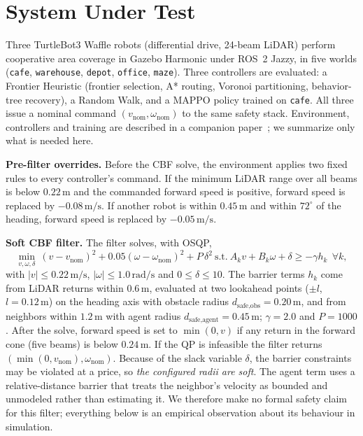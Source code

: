 \documentclass[12pt]{article}
\newcommand{\si}[1]{\mathrm{#1}}
\begin{document}
\section{System Under Test}
\label{sec:system}
Three TurtleBot3 Waffle robots (differential drive, 24-beam LiDAR) perform
cooperative area coverage in Gazebo Harmonic under ROS~2 Jazzy, in five
worlds (\texttt{cafe}, \texttt{warehouse}, \texttt{depot}, \texttt{office},
\texttt{maze}). Three controllers are evaluated: a Frontier Heuristic
(frontier selection, A* routing, Voronoi partitioning, behavior-tree
recovery), a Random Walk, and a MAPPO policy trained on \texttt{cafe}. All
three issue a nominal command $(v_{\text{nom}},\omega_{\text{nom}})$ to the
same safety stack. Environment, controllers and training are described in a
companion paper~\cite{pandhe2026mappo}; we summarize only what is needed
here.

\textbf{Pre-filter overrides.} Before the CBF solve, the environment applies
two fixed rules to every controller's command. If the minimum LiDAR range
over all beams is below $0.22\,\si{m}$ and the commanded forward speed is
positive, forward speed is replaced by $-0.08\,\si{m/s}$. If another robot
is within $0.45\,\si{m}$ and within $72^\circ$ of the heading, forward speed
is replaced by $-0.05\,\si{m/s}$.

\textbf{Soft CBF filter.} The filter solves, with OSQP,
\begin{equation}
\min_{v,\omega,\delta}\ (v-v_{\text{nom}})^2 + 0.05(\omega-\omega_{\text{nom}})^2
+ P\,\delta^2
\ \text{s.t.}\ A_k v + B_k\omega + \delta \ge -\gamma h_k\ \ \forall k,
\end{equation}
with $|v|\le0.22\,\si{m/s}$, $|\omega|\le1.0\,\si{rad/s}$ and
$0\le\delta\le10$. The barrier terms $h_k$ come from LiDAR returns within
$0.6\,\si{m}$, evaluated at two lookahead points ($\pm l$, $l=0.12\,\si{m}$)
on the heading axis with obstacle radius $d_{\text{safe,obs}}=0.20\,\si{m}$,
and from neighbors within $1.2\,\si{m}$ with agent radius
$d_{\text{safe,agent}}=0.45\,\si{m}$; $\gamma=2.0$ and $P=1000$. After the
solve, forward speed is set to $\min(0,v)$ if any return in the forward cone
(five beams) is below $0.24\,\si{m}$. If the QP is infeasible the filter
returns $(\min(0,v_{\text{nom}}),\omega_{\text{nom}})$. Because of the slack
variable $\delta$, the barrier constraints may be violated at a price, so
\emph{the configured radii are soft}. The agent term uses a relative-distance
barrier that treats the neighbor's velocity as bounded and unmodeled rather
than estimating it. We therefore make no formal safety claim for this
filter; everything below is an empirical observation about its behaviour in
simulation.
\end{document}
